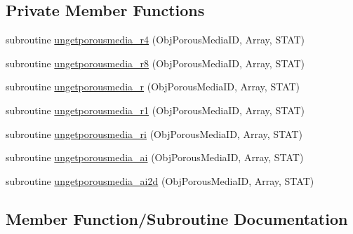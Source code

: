 \subsection*{Private Member Functions}
\begin{DoxyCompactItemize}
\item 
subroutine \mbox{\hyperlink{interfacemoduleporousmedia_1_1ungetporousmedia_a183ef8b351329e83ed82af2628c585a4}{ungetporousmedia\+\_\+r4}} (Obj\+Porous\+Media\+ID, Array, S\+T\+AT)
\item 
subroutine \mbox{\hyperlink{interfacemoduleporousmedia_1_1ungetporousmedia_a08a257dc11ecab54bbe59219197fa7e4}{ungetporousmedia\+\_\+r8}} (Obj\+Porous\+Media\+ID, Array, S\+T\+AT)
\item 
subroutine \mbox{\hyperlink{interfacemoduleporousmedia_1_1ungetporousmedia_a144c05ef20577cbe890f2dbac33742aa}{ungetporousmedia\+\_\+r}} (Obj\+Porous\+Media\+ID, Array, S\+T\+AT)
\item 
subroutine \mbox{\hyperlink{interfacemoduleporousmedia_1_1ungetporousmedia_a31578f6d565bda583c95167b9416f3ef}{ungetporousmedia\+\_\+r1}} (Obj\+Porous\+Media\+ID, Array, S\+T\+AT)
\item 
subroutine \mbox{\hyperlink{interfacemoduleporousmedia_1_1ungetporousmedia_a8173b26b502e515a5ba83ad4da399b9c}{ungetporousmedia\+\_\+ri}} (Obj\+Porous\+Media\+ID, Array, S\+T\+AT)
\item 
subroutine \mbox{\hyperlink{interfacemoduleporousmedia_1_1ungetporousmedia_aae144185e14ebf063475122688ae62f5}{ungetporousmedia\+\_\+ai}} (Obj\+Porous\+Media\+ID, Array, S\+T\+AT)
\item 
subroutine \mbox{\hyperlink{interfacemoduleporousmedia_1_1ungetporousmedia_ad0b9cd7656741d263b213cd38819d681}{ungetporousmedia\+\_\+ai2d}} (Obj\+Porous\+Media\+ID, Array, S\+T\+AT)
\end{DoxyCompactItemize}


\subsection{Member Function/\+Subroutine Documentation}
\mbox{\label{interfacemoduleporousmedia_1_1ungetporousmedia_aae144185e14ebf063475122688ae62f5}} 
